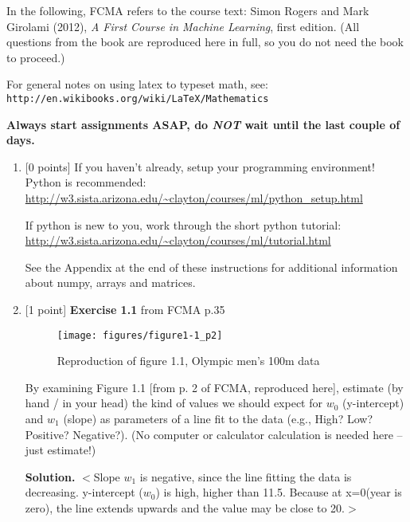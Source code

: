 \documentclass[10pt]{article}
\begin{document}
In the following, FCMA refers to the course text: Simon Rogers and Mark Girolami (2012), {\em A First Course in Machine Learning}, first edition.  (All questions from the book are reproduced here in full, so you do not need the book to proceed.)

For general notes on using latex to typeset math, see: {\tt http://en.wikibooks.org/wiki/LaTeX/Mathematics}

{\bf Always start assignments ASAP, do {\em NOT} wait until the last couple of days.}

\vspace{.5cm}


\newpage
\begin{enumerate}


\item \label{prob:1} [0 points]
If you haven't already, setup your programming environment!  Python is recommended:\\
\url{http://w3.sista.arizona.edu/~clayton/courses/ml/python_setup.html}

If python is new to you, work through the short python tutorial:\\
\url{http://w3.sista.arizona.edu/~clayton/courses/ml/tutorial.html}

See the Appendix at the end of these instructions for additional information about numpy, arrays and matrices.



\item \label{prob:2} [1 point]
{\bf Exercise 1.1} from FCMA p.35

\begin{figure}[htb]
\begin{center}
\texttt{[image: figures/figure1-1\_p2]}
\caption{Reproduction of figure 1.1, Olympic men's 100m data}
\end{center}
\end{figure}
By examining Figure 1.1 [from p. 2 of FCMA, reproduced here], estimate (by hand / in your head) the kind of values we should expect for $w_0$ (y-intercept) and $w_1$ (slope) as parameters of a line fit to the data (e.g., High? Low?  Positive?  Negative?).  (No computer or calculator calculation is needed here -- just estimate!)

{\bf Solution.} $<$Slope $w_1$ is negative, since the line fitting the data is decreasing.
 y-intercept ($w_0$) is high, higher than 11.5. Because at x=0(year is zero), the line extends upwards and the value may be close to 20.$>$\\


\end{enumerate}
\end{document}
